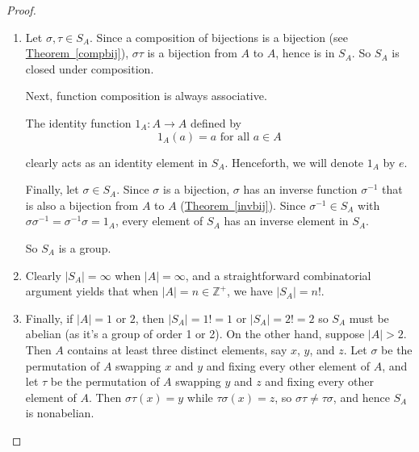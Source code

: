 \documentclass[10pt,]{book}
\theoremstyle{plain}
\theoremstyle{definition}
\theoremstyle{definition}
\theoremstyle{definition}
\theoremstyle{definition}
\numberwithin{equation}{section}
\def\Z{\mathbb{Z}}
\begin{document}
\begin{proof}\hypertarget{proof-27}{}
\leavevmode%
\begin{enumerate}
\item\hypertarget{li-324}{}
      Let \(\sigma, \tau \in S_A\). Since a composition of
      bijections is a bijection (see \hyperref[compbij]{Theorem~\ref{compbij}}), \(\sigma
      \tau\) is a bijection from \(A\) to \(A\), hence is in \(S_A\). So
      \(S_A\) is closed under composition.%
\par
Next,            function composition is always associative.%
\par
 The identity function \(1_A : A\to A\) defined by
\begin{equation*}

              1_A(a)=a \text{ for all \(a\in A\)}
            
\end{equation*}

            clearly acts as an
            identity element in \(S_A\). Henceforth, we will denote \(1_A\)
            by \(e\).
\par

            Finally, let \(\sigma \in S_A\).  Since \(\sigma\) is a
            bijection, \(\sigma\) has an inverse function \(\sigma^{-1}\)
            that is also a bijection from \(A\) to \(A\) (\hyperref[invbij]{Theorem~\ref{invbij}}). Since \(\sigma^{-1}\in S_A\) with \(\sigma
            \sigma^{-1}= \sigma^{-1} \sigma=1_A\), every element of
            \(S_A\) has an inverse element in \(S_A\).
\par

      So \(S_A\) is a group.
\item\hypertarget{li-325}{}
    Clearly \(|S_A|=\infty\) when \(|A|=\infty\), and a straightforward
    combinatorial argument yields that when \(|A|=n \in \Z^+\), we have
    \(|S_A|=n!\).%
\item\hypertarget{li-326}{}Finally, if \(|A|=1\) or \(2\), then \(|S_A|=1!=1\) or
    \(|S_A|=2!=2\) so \(S_A\) must be abelian (as it's a group of order 1 or
    2). On the other hand, suppose \(|A|>2\). Then \(A\) contains at least
    three distinct elements, say \(x\), \(y\), and \(z\). Let \(\sigma\) be the
    permutation of \(A\) swapping \(x\) and \(y\) and fixing every other
    element of \(A\), and let \(\tau\) be the permutation of \(A\) swapping
    \(y\) and \(z\) and fixing every other element of \(A\). Then \(\sigma
    \tau(x)=y\) while \(\tau \sigma(x)=z\), so \(\sigma \tau \neq \tau
    \sigma\), and hence \(S_A\) is nonabelian.%
\end{enumerate}
\end{proof}
\par
\end{document}
